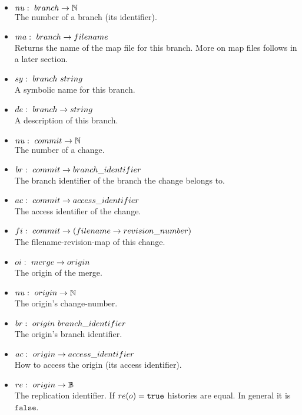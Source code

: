\documentclass[fleqn, 10pt, a4paper]{report} \usepackage{amssymb}
\begin{document}
\begin{itemize}
\item $\mathnormal{nu}:\ \mathnormal{branch} \rightarrow \mathbb{N}$ \\
  The number of a branch (its identifier).
\item $\mathnormal{ma}:\ \mathnormal{branch} \rightarrow
  \mathnormal{filename}$ \\
  Returns the name of the map file for this branch. More on map files
  follows in a later section.
\item $\mathnormal{sy}:\ \mathnormal{branch} \
  \mathnormal{string}$ \\
  A symbolic name for this branch.
\item $\mathnormal{de}:\ \mathnormal{branch}
  \rightarrow \mathnormal{string}$ \\
  A description of this branch.
\item $\mathnormal{nu}:\ \mathnormal{commit} \rightarrow \mathbb{N}$ \\
  The number of a change.
\item $\mathnormal{br}:\ \mathnormal{commit}
  \rightarrow \mathnormal{branch\_identifier}$ \\
  The branch identifier of the branch the change belongs to.
\item $\mathnormal{ac}:\ \mathnormal{commit}
  \rightarrow \mathnormal{access\_identifier}$ \\
  The access identifier of the change.
\item $\mathnormal{fi}:\ \mathnormal{commit} \rightarrow
  (\mathnormal{filename}
  \rightarrow \mathnormal{revision\_number})$ \\
  The filename-revision-map of this change.
\item $\mathnormal{oi}:\ \mathnormal{merge} \rightarrow
  \mathnormal{origin}$ \\
  The origin of the merge.
\item $\mathnormal{nu}:\ \mathnormal{origin} \rightarrow \mathbb{N}$ \\
  The origin's change-number.
\item $\mathnormal{br}:\ \mathnormal{origin} \
  \mathnormal{branch\_identifier}$ \\
  The origin's branch identifier.
\item $\mathnormal{ac}:\ \mathnormal{origin} \rightarrow
  \mathnormal{access\_identifier}$ \\
  How to access the origin (its access identifier).
\item $\mathnormal{re}:\ \mathnormal{origin} \rightarrow \mathbb{B}$ \\
  The replication identifier. If $\mathnormal{re}(o) = \mathtt{true}$
  histories are equal. In general it is $\mathtt{false}$.
\end{itemize}
\end{document}
